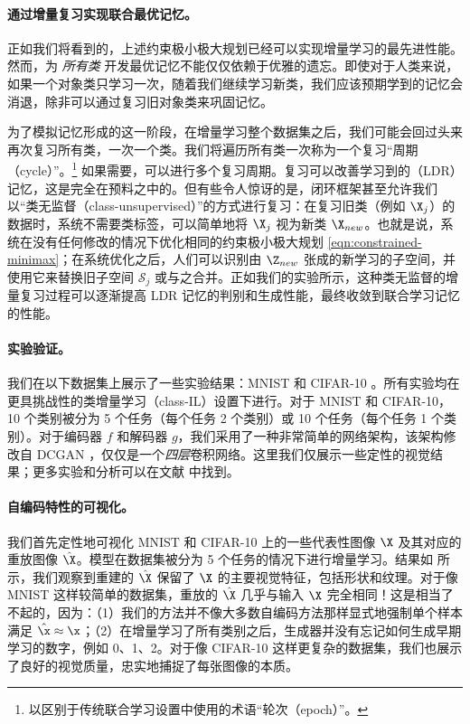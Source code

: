 \documentclass[../../book-main_zh.tex]{subfiles}
\begin{document}
\paragraph{通过增量复习实现联合最优记忆。}
正如我们将看到的，上述约束极小极大规划已经可以实现增量学习的最先进性能。然而，为 {\em 所有类} 开发最优记忆不能仅仅依赖于优雅的遗忘。即使对于人类来说，如果一个对象类只学习一次，随着我们继续学习新类，我们应该预期学到的记忆会消退，除非可以通过复习旧对象类来巩固记忆。 %

为了模拟记忆形成的这一阶段，在增量学习整个数据集之后，我们可能会回过头来再次复习所有类，一次一个类。我们将遍历所有类一次称为一个复习“周期（cycle）”。\footnote{以区别于传统联合学习设置中使用的术语“轮次（epoch）”。} 如果需要，可以进行多个复习周期。复习可以改善学习到的（LDR）记忆，这是完全在预料之中的。但有些令人惊讶的是，闭环框架甚至允许我们以“类无监督（class-unsupervised）”的方式进行复习：在复习旧类（例如 $\X_j$）的数据时，系统不需要类标签，可以简单地将 $\X_j$ 视为新类 $\X_{new}$。也就是说，系统在没有任何修改的情况下优化相同的约束极小极大规划 \eqref{eqn:constrained-minimax}；在系统优化之后，人们可以识别由 $\Z_{new}$ 张成的新学习的子空间，并使用它来替换旧子空间 $\mathcal{S}_j$ 或与之合并。正如我们的实验所示，这种类无监督的增量复习过程可以逐渐提高 LDR 记忆的判别和生成性能，最终收敛到联合学习记忆的性能。

\paragraph{实验验证。}
我们在以下数据集上展示了一些实验结果：MNIST
\cite{lecun1998gradient} 和 CIFAR-10 \cite{krizhevsky2014cifar}。所有实验均在更具挑战性的类增量学习（class-IL）设置下进行。对于 MNIST 和 CIFAR-10，10 个类别被分为 5 个任务（每个任务 2 个类别）或 10 个任务（每个任务 1 个类别）。对于编码器 $f$ 和解码器 $g$，我们采用了一种非常简单的网络架构，该架构修改自 DCGAN \cite{radford2016unsupervised}，仅仅是一个{\em 四层}卷积网络。这里我们仅展示一些定性的视觉结果；更多实验和分析可以在文献 \cite{tong2023incremental} 中找到。

\paragraph{自编码特性的可视化。}
我们首先定性地可视化 MNIST 和 CIFAR-10 上的一些代表性图像 $\X$ 及其对应的重放图像 $\hat{\X}$。模型在数据集被分为 5 个任务的情况下进行增量学习。结果如  所示，我们观察到重建的 $\hat{\X}$ 保留了 $\X$ 的主要视觉特征，包括形状和纹理。对于像 MNIST 这样较简单的数据集，重放的 $\hat{\X}$ 几乎与输入 $\X$ 完全相同！这是相当了不起的，因为：（1）我们的方法并不像大多数自编码方法那样显式地强制单个样本满足 $\hat{\x} \approx \x$；（2）在增量学习了所有类别之后，生成器并没有忘记如何生成早期学习的数字，例如 0、1、2。对于像 CIFAR-10 这样更复杂的数据集，我们也展示了良好的视觉质量，忠实地捕捉了每张图像的本质。
\end{document}
